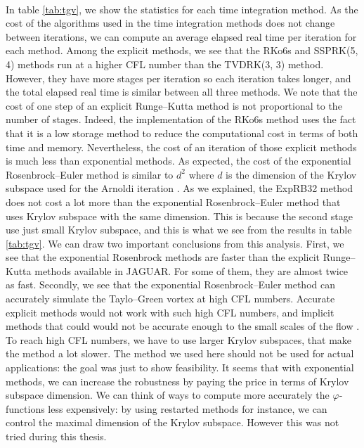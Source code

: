       \paragraph{}
      In table \ref{tab:tgv}, we show the statistics for each time integration method.
      As the cost of the algorithms used in the time integration methods does not change between iterations, we can compute an average elapsed real time per iteration for each method.
      Among the explicit methods, we see that the RKo6s and SSPRK(5, 4) methods run at a higher CFL number than the TVDRK(3, 3) method.
      However, they have more stages per iteration so each iteration takes longer, and the total elapsed real time is similar between all three methods.
      We note that the cost of one step of an explicit Runge--Kutta method is not proportional to the number of stages.
      Indeed, the implementation of the RKo6s method uses the fact that it is a low storage method to reduce the computational cost in terms of both time and memory.
      Nevertheless, the cost of an iteration of those explicit methods is much less than exponential methods.
      As expected, the cost of the exponential Rosenbrock--Euler method is similar to $d^2$ where $d$ is the dimension of the Krylov subspace used for the Arnoldi iteration .
      As we explained, the ExpRB32 method does not cost a lot more than the exponential Rosenbrock--Euler method that uses Krylov subspace with the same dimension.
      This is because the second stage use just small Krylov subspace, and this is what we see from the results in table \ref{tab:tgv}.
      We can draw two important conclusions from this analysis.
      First, we see that the exponential Rosenbrock methods are faster than the explicit Runge--Kutta methods available in JAGUAR.
      For some of them, they are almost twice as fast.
      Secondly, we see that the exponential Rosenbrock--Euler method can accurately simulate the Taylo--Green vortex at high CFL numbers.
      Accurate explicit methods would not work with such high CFL numbers, and implicit methods that could would not be accurate enough to  the small scales of the flow .
      To reach high CFL numbers, we have to use larger Krylov subspaces, that make the method a lot slower.
      The method we used here should not be used for actual applications: the goal was just to show feasibility.
      It seems that with exponential methods, we can increase the robustness by paying the price in terms of Krylov subspace dimension.
      We can think of ways to compute more accurately the $\varphi$-functions less expensively: by using restarted methods for instance, we can control the maximal dimension of the Krylov subspace.
      However this was not tried during this thesis.

